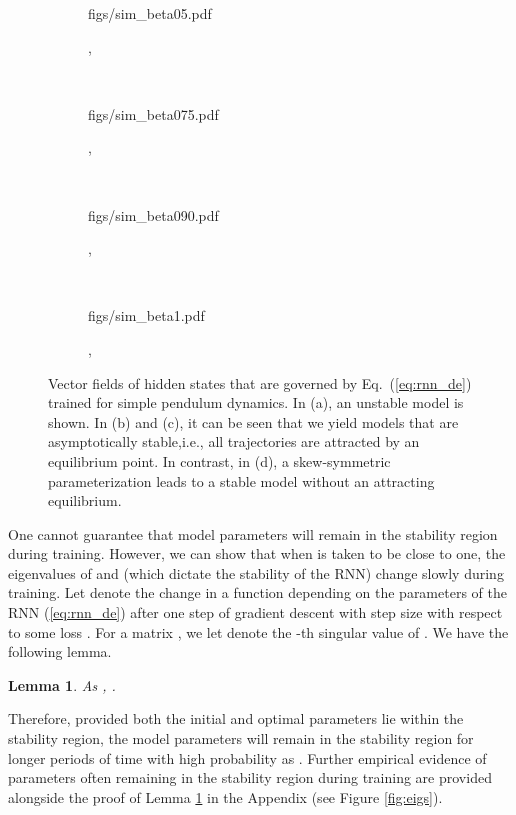 \documentclass{article} \usepackage{iclr2021_conference,times}
\newtheorem{lemma}{Lemma}
\begin{document}
\begin{figure}[!t]
	\centering
	\begin{subfigure}[t]{0.23\textwidth}
		\centering
		\begin{overpic}[width=1\textwidth]{figs/sim_beta05.pdf}
\end{overpic}\vspace{-0.1cm}		
		\caption{, }
	\end{subfigure}~
	\begin{subfigure}[t]{0.23\textwidth}
		\centering
		\begin{overpic}[width=1\textwidth]{figs/sim_beta075.pdf} 
\end{overpic}\vspace{-0.1cm}			
		\caption{, }
	\end{subfigure}~
	\begin{subfigure}[t]{0.23\textwidth}
		\centering
		\begin{overpic}[width=1\textwidth]{figs/sim_beta090.pdf} 
\end{overpic}\vspace{-0.1cm}			
		\caption{, }
	\end{subfigure}~
	\begin{subfigure}[t]{0.23\textwidth}
		\centering
		\begin{overpic}[width=1\textwidth]{figs/sim_beta1.pdf} 
\end{overpic}\vspace{-0.1cm}			
		\caption{, }
	\end{subfigure}

	\caption{Vector fields of hidden states that are governed by Eq.~(\ref{eq:rnn_de}) trained for simple pendulum dynamics. In (a), an unstable model is shown. In (b) and (c), it can be seen that we yield models that are asymptotically stable,i.e., all trajectories are attracted by an equilibrium point. In contrast, in (d), a skew-symmetric parameterization leads to a stable model without an attracting equilibrium.}	
	
	\label{fig:stability_simulation}
\end{figure}


One cannot guarantee that model parameters will remain in the stability region during training. However, we can show that when  is taken to be close to one, the eigenvalues of  and  (which dictate the stability of the RNN) change slowly during training. Let  denote the change in a function  depending on the parameters of the RNN (\ref{eq:rnn_de}) after one step of gradient descent with step size  with respect to some loss . For a matrix , we let  denote the -th singular value of . We have the following lemma.
\begin{lemma}
\label{lem:Training}
As , .
\end{lemma}
Therefore, provided both the initial and optimal parameters lie within the stability region, the model parameters will remain in the stability region for longer periods of time with high probability as . Further empirical evidence of parameters often remaining in the stability region during training are provided alongside the proof of Lemma \ref{lem:Training} in the Appendix (see Figure \ref{fig:eigs}).
\end{document}
